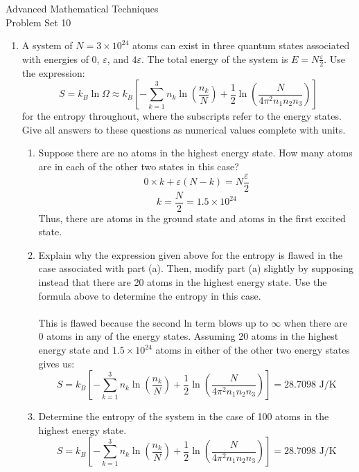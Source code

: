 \documentclass{article}
\begin{document}
    \thispagestyle{fancy}
    \begin{center}
                \LARGE{Advanced Mathematical Techniques \\ Problem Set 10}
    \end{center}
    \vspace{10mm}
    \begin{enumerate}
        \item A system of $N=3\times10^{24}$ atoms can exist in three quantum states associated with energies of 0, $\varepsilon$, and $4\varepsilon$. The total energy of the system is $E = N\frac \varepsilon 2$. Use the expression:
        \[S = k_B \ln \Omega \approx k_B \left[-\sum_{k=1}^{3} n_k \ln(\frac{n_k}{N}) + \frac 1 2 \ln(\frac{N}{4\pi^2n_1n_2n_3})\right]\]
        for the entropy throughout, where the subscripts refer to the energy states. Give all answers to these questions as numerical values complete with units.
        \begin{enumerate}
            \item Suppose there are no atoms in the highest energy state. How many atoms are in each of the other two states in this case?
            \\
            \[0\times k + \varepsilon(N-k) = N\frac{\varepsilon}{2}\]
            \[k = \frac{N}{2} = \boxed{1.5 \times 10^{24}}\]
            Thus, there are  atoms in the ground state and  atoms in the first excited state.
            \item Explain why the expression given above for the entropy is flawed in the case associated with part (a). Then, modify part (a) slightly by supposing instead that there are 20 atoms in the highest energy state. Use the formula above to determine the entropy in this case.
            \\
            \\This is flawed because the second ln term blows up to $\infty$ when there are 0 atoms in any of the energy states. Assuming 20 atoms in the highest energy state and $1.5 \times 10^{24}$ atoms in either of the other two energy states gives us:
            \[S = k_B \left[-\sum_{k=1}^{3} n_k \ln(\frac{n_k}{N}) + \frac 1 2 \ln(\frac{N}{4\pi^2n_1n_2n_3})\right] = \boxed{28.7098 \text{ J/K}}\]
            \item Determine the entropy of the system in the case of 100 atoms in the highest energy state.
            \\
            \[S = k_B \left[-\sum_{k=1}^{3} n_k \ln(\frac{n_k}{N}) + \frac 1 2 \ln(\frac{N}{4\pi^2n_1n_2n_3})\right] = \boxed{28.7098 \text{ J/K}}\]

\end{enumerate}
\end{enumerate}
\end{document}
